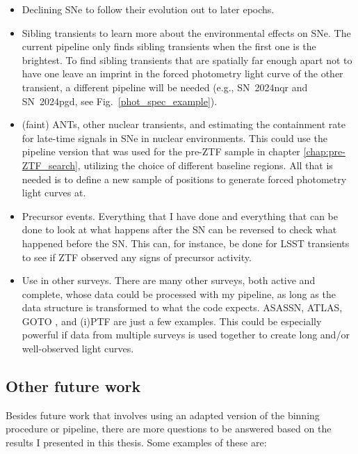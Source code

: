 \documentclass[a4paper,oneside,12pt, class=Latex/Classes/PhDthesisPSnPDF, crop=false]{standalone}
\begin{document}
\begin{itemize}
	\item Declining SNe to follow their evolution out to later epochs.
	\item Sibling transients to learn more about the environmental effects on SNe. The current pipeline only finds sibling transients when the first one is the brightest. To find sibling transients that are spatially far enough apart not to have one leave an imprint in the forced photometry light curve of the other transient, a different pipeline will be needed (e.g., SN~2024nqr and SN~2024pgd, see Fig.~\ref{phot_spec_example}).
	\item (faint) ANTs, other nuclear transients, and estimating the containment rate for late-time signals in SNe in nuclear environments. This could use the pipeline version that was used for the pre-ZTF sample in chapter \ref{chap:pre-ZTF_search}, utilizing the choice of different baseline regions. All that is needed is to define a new sample of positions to generate forced photometry light curves at.
	\item Precursor events. Everything that I have done and everything that can be done to look at what happens after the SN can be reversed to check what happened before the SN. This can, for instance, be done for LSST transients to see if ZTF observed any signs of precursor activity.
	\item Use in other surveys. There are many other surveys, both active and complete, whose data could be processed with my pipeline, as long as the data structure is transformed to what the code expects. ASASSN, ATLAS, GOTO \citep[Gravitational-wave Optical Transient Observer,][]{GOTO_prototype, GOTO}, and (i)PTF are just a few examples. This could be especially powerful if data from multiple surveys is used together to create long and/or well-observed light curves.
\end{itemize}


\subsection{Other future work}
Besides future work that involves using an adapted version of the binning procedure or pipeline, there are more questions to be answered based on the results I presented in this thesis. Some examples of these are:
\end{document}
